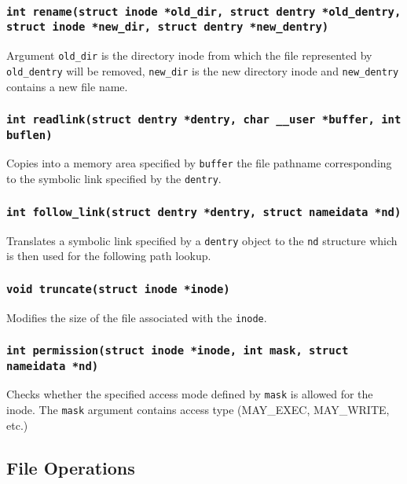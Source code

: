 \subsubsection{\texttt{int rename(struct inode *old\_dir, struct dentry
*old\_dentry,\\ struct inode *new\_dir, struct dentry *new\_dentry)}}

Argument \texttt{old\_dir} is the directory inode from which the file represented
by \texttt{old\_dentry} will be removed, \texttt{new\_dir} is the new directory inode and
\texttt{new\_dentry} contains a new file name.

\subsubsection{\texttt{int readlink(struct dentry *dentry, char \_\_user *buffer,
int buflen)}}

Copies into a memory area specified by \texttt{buffer} the file pathname corresponding
to the symbolic link specified by the \texttt{dentry}.

\subsubsection{\texttt{int follow\_link(struct dentry *dentry, struct nameidata *nd)}}

Translates a symbolic link specified by a \texttt{dentry} object to the \texttt{nd}
structure which is then used for the following path lookup. 

\subsubsection{\texttt{void truncate(struct inode *inode)}}

Modifies the size of the file associated with the \texttt{inode}.


\subsubsection{\texttt{int permission(struct inode *inode, int mask, struct nameidata
*nd)}}

Checks whether the specified access mode defined by \texttt{mask} is allowed for the
inode. The \texttt{mask} argument contains access type (MAY\_EXEC, MAY\_WRITE, etc.)

\subsection{File Operations}

